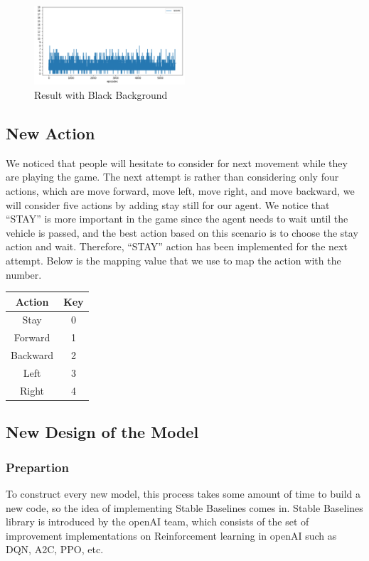 \documentclass{article}
\begin{document}
\begin{figure}[H]
    \caption{Result with Black Background}
    \centering
    \includegraphics[width=0.5\textwidth]{result_black_background.png}
\end{figure}

\subsection{New Action}
We noticed that people will hesitate to consider for next movement while they are playing the game. The next attempt is rather than considering only four actions, which are move forward, move left, move right, and move backward, we will consider five actions by adding stay still for our agent. We notice that “STAY” is more important in the game since the agent needs to wait until the vehicle is passed, and the best action based on this scenario is to choose the stay action and wait. Therefore, “STAY” action has been implemented for the next attempt. Below is the mapping value that we use to map the action with the number.

\begin{center}
    \begin{tabular}{ | c | c |} 
        \hline
        Action & Key \\ 
        \hline
        Stay & 0\\ 
        \hline
        Forward & 1\\ 
        \hline
        Backward & 2 \\ 
        \hline
        Left & 3 \\
        \hline
        Right & 4 \\ 
        \hline
    \end{tabular}   
\end{center}

\subsection{New Design of the Model}
\subsubsection{Prepartion}
To construct every new model, this process takes some amount of time to build a new code, so the idea of implementing Stable Baselines comes in. Stable Baselines library is introduced by the openAI team, which consists of the set of improvement implementations on Reinforcement learning in openAI such as DQN, A2C, PPO, etc. \par 
\end{document}

